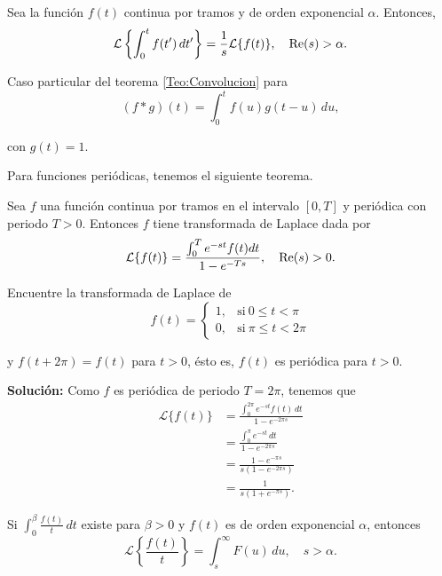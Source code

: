 \begin{teorema}
     Sea la función $f(t)$ continua por tramos y de orden exponencial $\alpha$. Entonces,
     $$\mathcal{L} \left\{ \int_0^t f(t') \,dt'\right\} = \frac{1}{s} \mathcal{L}\{f(t)\}, \quad \operatorname{Re}(s) > \alpha.$$
\end{teorema}

\begin{demo}
Caso particular del teorema \ref{Teo:Convolucion} para 
$$(f * g)(t) = \int_0^t f(u) g(t-u) \,du,$$

con $g(t) = 1$.
\end{demo}

Para funciones periódicas, tenemos el siguiente teorema.

\begin{teorema}
 Sea $f$ una función continua por tramos en el intervalo $[0,T]$ y periódica con periodo $T>0$. Entonces $f$ tiene transformada de Laplace dada por
\begin{equation*}
\mathcal{L}\{f(t)\} = \frac{\int_0^T e^{-st} f(t) dt}{1-e^{-Ts}}, \quad \operatorname{Re}(s) > 0.
\end{equation*}
   
\end{teorema}

\begin{ejemplo}
    Encuentre la transformada de Laplace de
    $$f(t) = \left\{ \begin{array}{cl}
     1,& \text{si} ~ 0 \leq t < \pi  \\
     0,& \text{si} ~ \pi \leq t < 2\pi
    \end{array} \right.$$

    y $f(t+ 2\pi) = f(t)$ para $t > 0$, ésto es, $f(t)$ es periódica para $t > 0$.

    \textbf{Solución:} Como $f$ es periódica de periodo $T = 2\pi$, tenemos que
    \begin{align*}
        \mathcal{L}\{f(t)\} &= \frac{\int_0^{2\pi} e^{-st} f(t) \,dt}{1-e^{-2\pi s}} \\
        &= \frac{\int_0^{\pi} e^{-st}\,dt}{1-e^{-2\pi s}} \\
        &= \frac{1-e^{-\pi s}}{s(1-e^{-2\pi s})} \\
        &= \frac{1}{s(1+e^{-\pi s})}.
    \end{align*}
\end{ejemplo}

\begin{teorema}
   Si $\int_0^{\beta} \frac{f(t)}{t} \,dt$ existe para $\beta > 0$ y $f(t)$ es de orden exponencial $\alpha$, entonces
   $$\mathcal{L}\left\{\frac{f(t)}{t}\right\} = \int_s^{\infty} F(u) \,du, \quad s > \alpha.$$
\end{teorema}

